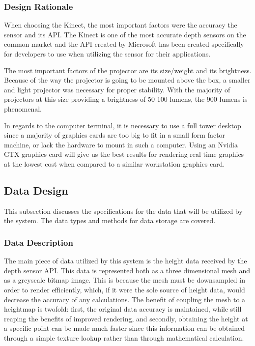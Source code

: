 \subsubsection{Design Rationale}

When choosing the Kinect, the most important factors were the accuracy the sensor and its API.
The Kinect is one of the most accurate depth sensors on the common market and the API created by Microsoft has been created specifically for developers to use when utilizing the sensor for their applications.

The most important factors of the projector are its size/weight and its brightness.
Because of the way the projector is going to be mounted above the box, a smaller and light projector was necessary for proper stability.
With the majority of projectors at this size providing a brightness of 50-100 lumens, the 900 lumens is phenomenal.

In regards to the computer terminal, it is necessary to use a full tower desktop since a majority of graphics cards are too big to fit in a small form factor machine, or lack the hardware to mount in such a computer. Using an Nvidia GTX graphics card will give us the best results for rendering real time graphics at the lowest cost when compared to a similar workstation graphics card.

\subsection{Data Design} %
This subsection discusses the specifications for the data that will be utilized by the system. The data types and methods for data storage are covered.
\subsubsection{Data Description}
The main piece of data utilized by this system is the height data received by the depth sensor API. This data is represented both as a three dimensional mesh and as a greyscale bitmap image. 
This is because the mesh must be downsampled in order to render efficiently, which, if it were the sole source of height data, would decrease the accuracy of any calculations. 
The benefit of coupling the mesh to a heightmap is twofold: first, the original data accuracy is maintained, while still reaping the benefits of improved rendering, and secondly, obtaining the height at a specific point can be made much faster since this information can be obtained through a simple texture lookup rather than through mathematical calculation.  

